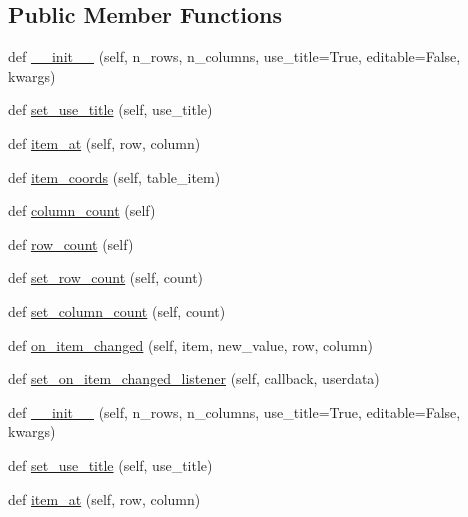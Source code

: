 \subsection*{Public Member Functions}
\begin{DoxyCompactItemize}
\item 
def \hyperlink{classremi_1_1gui_1_1TableWidget_ab08a68c78e882d9bd183b95edb74a22c}{\+\_\+\+\_\+init\+\_\+\+\_\+} (self, n\+\_\+rows, n\+\_\+columns, use\+\_\+title=True, editable=False, kwargs)
\item 
def \hyperlink{classremi_1_1gui_1_1TableWidget_a9218499d5222e9fe3a791465a86254c9}{set\+\_\+use\+\_\+title} (self, use\+\_\+title)
\item 
def \hyperlink{classremi_1_1gui_1_1TableWidget_ac0dc549efec3022d831c7a84991fba89}{item\+\_\+at} (self, row, column)
\item 
def \hyperlink{classremi_1_1gui_1_1TableWidget_ac7e5bb14d4ef59a0be1b5a2bd0e8ccb8}{item\+\_\+coords} (self, table\+\_\+item)
\item 
def \hyperlink{classremi_1_1gui_1_1TableWidget_a4a15eaf75be49c70f7565a8959f1ac7e}{column\+\_\+count} (self)
\item 
def \hyperlink{classremi_1_1gui_1_1TableWidget_a159fb69684ef04c24c431ee9b1a886c2}{row\+\_\+count} (self)
\item 
def \hyperlink{classremi_1_1gui_1_1TableWidget_a7285e72d46c2fc90cd439a74a7d3fea1}{set\+\_\+row\+\_\+count} (self, count)
\item 
def \hyperlink{classremi_1_1gui_1_1TableWidget_afc003e25fc2c6b56b4be6e5e1be84eda}{set\+\_\+column\+\_\+count} (self, count)
\item 
def \hyperlink{classremi_1_1gui_1_1TableWidget_a6f2e578d9fee320d5b1ec66a79659142}{on\+\_\+item\+\_\+changed} (self, item, new\+\_\+value, row, column)
\item 
def \hyperlink{classremi_1_1gui_1_1TableWidget_a2d3eb5a940379cc06b4bf547066f141e}{set\+\_\+on\+\_\+item\+\_\+changed\+\_\+listener} (self, callback, userdata)
\item 
def \hyperlink{classremi_1_1gui_1_1TableWidget_ab08a68c78e882d9bd183b95edb74a22c}{\+\_\+\+\_\+init\+\_\+\+\_\+} (self, n\+\_\+rows, n\+\_\+columns, use\+\_\+title=True, editable=False, kwargs)
\item 
def \hyperlink{classremi_1_1gui_1_1TableWidget_a9218499d5222e9fe3a791465a86254c9}{set\+\_\+use\+\_\+title} (self, use\+\_\+title)
\item 
def \hyperlink{classremi_1_1gui_1_1TableWidget_ac0dc549efec3022d831c7a84991fba89}{item\+\_\+at} (self, row, column)

\end{DoxyCompactItemize}
